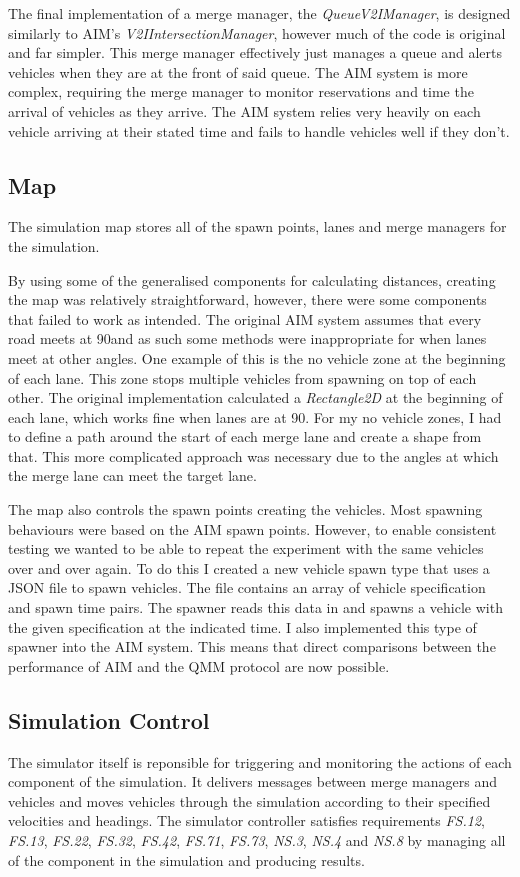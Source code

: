 The final implementation of a merge manager, the \emph{QueueV2IManager}, is designed similarly to AIM's \emph{V2IIntersectionManager}, however much of the code is original and far simpler. This merge manager effectively just manages a queue and alerts vehicles when they are at the front of said queue. The AIM system is more complex, requiring the merge manager to monitor reservations and time the arrival of vehicles as they arrive. The AIM system relies very heavily on each vehicle arriving at their stated time and fails to handle vehicles well if they don't.

\subsection{Map}
\label{subsec:Map}
The simulation map stores all of the spawn points, lanes and merge managers for the simulation.

By using some of the generalised components for calculating distances, creating the map was relatively straightforward, however, there were some components that failed to work as intended. The original AIM system assumes that every road meets at 90\degree and as such some methods were inappropriate for when lanes meet at other angles. One example of this is the no vehicle zone at the beginning of each lane. This zone stops multiple vehicles from spawning on top of each other. The original implementation calculated a \emph{Rectangle2D} at the beginning of each lane, which works fine when lanes are at 90\degree. For my no vehicle zones, I had to define a path around the start of each merge lane and create a shape from that. This more complicated approach was necessary due to the angles at which the merge lane can meet the target lane. 

The map also controls the spawn points creating the vehicles. Most spawning behaviours were based on the AIM spawn points. However, to enable consistent testing we wanted to be able to repeat the experiment with the same vehicles over and over again. To do this I created a new vehicle spawn type that uses a JSON file to spawn vehicles. The file contains an array of vehicle specification and spawn time pairs. The spawner reads this data in and spawns a vehicle with the given specification at the indicated time. I also implemented this type of spawner into the AIM system. This means that direct comparisons between the performance of AIM and the QMM protocol are now possible.

\subsection{Simulation Control}
\label{subsec:Simulation Control}
The simulator itself is reponsible for triggering and monitoring the actions of each component of the simulation. It delivers messages between merge managers and vehicles and moves vehicles through the simulation according to their specified velocities and headings. The simulator controller satisfies requirements \emph{FS.12}, \emph{FS.13}, \emph{FS.22}, \emph{FS.32}, \emph{FS.42}, \emph{FS.71}, \emph{FS.73}, \emph{NS.3}, \emph{NS.4} and \emph{NS.8} by managing all of the component in the simulation and producing results.

